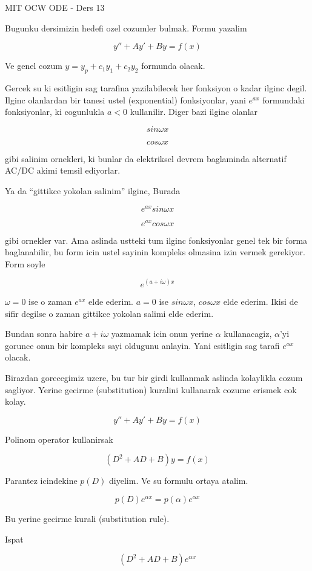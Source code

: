 \documentclass[12pt,fleqn]{article}
\begin{document}
MIT OCW ODE - Ders 13

Bugunku dersimizin hedefi ozel cozumler bulmak. Formu yazalim

\[ y'' + Ay' + By = f(x) \]

Ve genel cozum $y = y_p + c_1y_1 + c_2y_2$ formunda olacak. 

Gercek su ki esitligin sag tarafina yazilabilecek her fonksiyon o kadar
ilginc degil. Ilginc olanlardan bir tanesi ustel (exponential)
fonksiyonlar, yani $e^{ax}$ formundaki fonksiyonlar, ki cogunlukla $a<0$
kullanilir. Diger bazi ilginc olanlar 

\[ sin \omega x \]

\[ cos \omega x \]

gibi salinim
ornekleri, ki bunlar da elektriksel devrem baglaminda alternatif AC/DC
akimi temsil ediyorlar.

Ya da ``gittikce yokolan salinim'' ilginc, Burada 

\[ e^{ax}sin \omega x \]

\[ e^{ax}cos \omega x \]

gibi ornekler var. Ama aslinda ustteki tum ilginc fonksiyonlar genel tek
bir forma baglanabilir, bu form icin ustel sayinin kompleks olmasina izin
vermek gerekiyor. Form soyle

\[ e^{(a+i\omega)x} \]

$\omega = 0$ ise o zaman $e^{ax}$ elde ederim. $a=0$ ise $sin\omega x$,
$cos\omega x$ elde ederim. Ikisi de sifir degilse o zaman gittikce yokolan
salimi elde ederim. 

Bundan sonra habire $a+i\omega$ yazmamak icin onun yerine $\alpha$
kullanacagiz, $\alpha$'yi gorunce onun bir kompleks sayi oldugunu
anlayin. Yani esitligin sag tarafi $e^{\alpha x}$ olacak. 

Birazdan gorecegimiz uzere, bu tur bir girdi kullanmak aslinda kolaylikla
cozum sagliyor. Yerine gecirme (substitution) kuralini kullanarak cozume
erismek cok kolay. 

\[ y'' + Ay' + By = f(x) \]

Polinom operator kullanirsak

\[ (D^2 + AD + B )y = f(x) \]

Parantez icindekine $p(D)$ diyelim. Ve su formulu ortaya atalim. 

\[ p(D)e^{\alpha x} = p(\alpha)e^{\alpha x}  \]

Bu yerine gecirme kurali (substitution rule). 

Ispat

\[ (D^2 + AD + B )e^{\alpha x} \]
\end{document}
